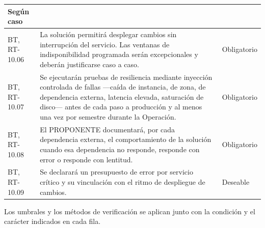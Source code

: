 \begin{longtable}{|L{0.098425\AnchoTablaAnexo}|L{0.814961\AnchoTablaAnexo}|L{0.086614\AnchoTablaAnexo}|}
Según caso \\ \hline
BT, RT-10.06 &
La solución permitirá desplegar cambios sin interrupción del servicio. Las ventanas de indisponibilidad programada serán excepcionales y deberán justificarse caso a caso. &
Obligatorio \\ \hline
{}
BT, RT-10.07 &
Se ejecutarán pruebas de resiliencia mediante inyección controlada de fallas —caída de instancia, de zona, de dependencia externa, latencia elevada, saturación de disco— antes de cada paso a producción y al menos una vez por semestre durante la Operación. &
Obligatorio \\ \hline
BT, RT-10.08 &
El PROPONENTE documentará, por cada dependencia externa, el comportamiento de la solución cuando esa dependencia no responde, responde con error o responde con lentitud. &
Obligatorio \\ \hline
{}
BT, RT-10.09 &
Se declarará un presupuesto de error por servicio crítico y su vinculación con el ritmo de despliegue de cambios. &
Deseable \\ \hline
\end{longtable}

Los umbrales y los métodos de verificación se aplican junto con la condición y el carácter indicados en cada fila.

